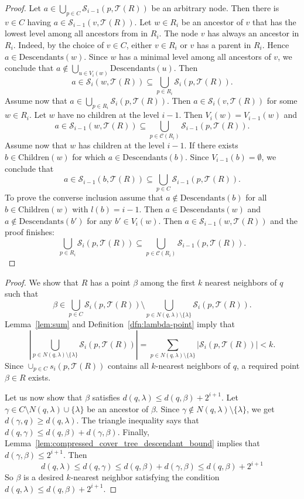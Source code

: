 \documentclass[a4paper,UKenglish,cleveref, autoref]{lipics-v2019}
\numberwithin{algocf}{section}
\theoremstyle{definition}
\theoremstyle{definition}
\theoremstyle{definition}
\theoremstyle{plain}
\newcommand{\Child}{\mathrm{Children}}
\newcommand{\Desc}{\mathrm{Descendants}}
\newcommand{\C}{\mathcal{C}}
\newcommand{\T}{\mathcal{T}}
\newcommand{\Sd}{\mathcal{S}}
\begin{document}
\lemchildsetequivalence*
\begin{proof}
Let $a \in \bigcup_{p \in C}\Sd_{i-1}(p, \T(R))$ be an arbitrary node. Then there is $v \in C$ having $ a \in \Sd_{i-1}(v, \T(R))$. 
Let $w \in R_i$ be an ancestor of $v$ that has the lowest level among all ancestors from in $R_i$. 
The node $v$ has always an ancestor in $R_i$.
Indeed, by the choice of $v \in C$, either $v \in R_i$ or $v$ has a parent in $R_i$. Hence $a \in \Desc(w)$. 
Since $w$ has a minimal level among all ancestors of $v$, we conclude that $a \notin  \bigcup_{u \in V_i(w)}\Desc(u)$.
Then
$$a \in \Sd_i(w, \T(R)) \subseteq \bigcup_{p \in R_i}\Sd_i(p , \T(R)).$$
Assume now that $a \in \bigcup\limits_{p \in R_i}\Sd_{i}(p, \T(R))$. 
Then $a \in \Sd_{i}(v, \T(R))$ for some $w \in R_i$.
Let $w$ have no children at the level $i-1$. 
Then $V_i(w) = V_{i-1}(w)$ and 
$$a \in \Sd_{i-1}(w, \T(R)) \subseteq \bigcup_{p \in \C(R_i)}\Sd_{i-1}(p ,\T(R)).$$ 
Assume now that $w$ has children at the level $i-1$.
If there exists $b \in \Child(w)$ for which $a \in \Desc(b)$. 
Since $V_{i-1}(b) = \emptyset$, we conclude that 
$$a \in \Sd_{i-1}(b, \T(R)) \subseteq \bigcup_{p \in C}\Sd_{i-1}(p ,\T(R)).$$ 
To prove the converse inclusion assume that $a \notin \Desc(b)$ for all $b \in \Child(w)$ with $l(b) = i-1$.
Then $a \in \Desc(w)$ and $a \notin \Desc(b')$ for any $b' \in V_i(w)$. Then $a \in \Sd_{i-1}(w, \T(R))$ and the proof finishes:
$$\bigcup_{p \in R_i}\Sd_{i}(p, \T(R))   \subseteq   \bigcup_{p \in \C(R_i)}\Sd_{i-1}(p, \T(R)).  $$
\end{proof}

\lembetapoint*
\begin{proof}
We show that $R$ has a point $\beta$ among the first $k$ nearest neighbors of $q$ such that
$$\beta \in \bigcup_{p \in C}\Sd_i(p, \T(R)) \setminus \bigcup_{p \in N(q, \lambda) \setminus \{\lambda\} }\Sd_i(p, \T(R)).$$
Lemma~\ref{lem:sum} and Definition~\ref{dfn:lambda-point} imply that
$$ | \bigcup_{p \in N(q, \lambda) \setminus \{\lambda\} }\Sd_i(p, \T(R)) |= \sum_{p \in N(q, \lambda) \setminus \{\lambda\} }| \Sd_i(p, \T(R)) | < k.$$ 
Since $\cup_{p \in C}s_i(p, \T(R))$ contains all $k$-nearest neighbors of $q$, a required point $\beta\in R$ exists. 
\medskip
 
Let us now show that $\beta$ satisfies $d(q,\lambda) \leq  d(q,\beta) + 2^{i+1}$.
Let $\gamma \in C \setminus N(q,\lambda) \cup \{\lambda \}$ be an ancestor of $\beta$. 
Since $\gamma \notin N(q,\lambda) \setminus \{\lambda\}$, we get $d(\gamma, q) \geq d(q, \lambda)$.  
The triangle inequality says that $ d(q, \gamma) \leq d(q,\beta) + d(\gamma ,\beta) $.
Finally, Lemma~\ref{lem:compressed_cover_tree_descendant_bound} implies that $d(\gamma, \beta) \leq 2^{i+1}$. 
Then
$$d(q,\lambda) \leq d(q, \gamma) \leq d(q,\beta) + d(\gamma ,\beta) \leq d(q,\beta) +2^{i+1}$$
So $\beta$ is a desired $k$-nearest neighbor satisfying the condition $d(q,\lambda) \leq  d(q,\beta) + 2^{i+1}$.
\end{proof}
\end{document}
